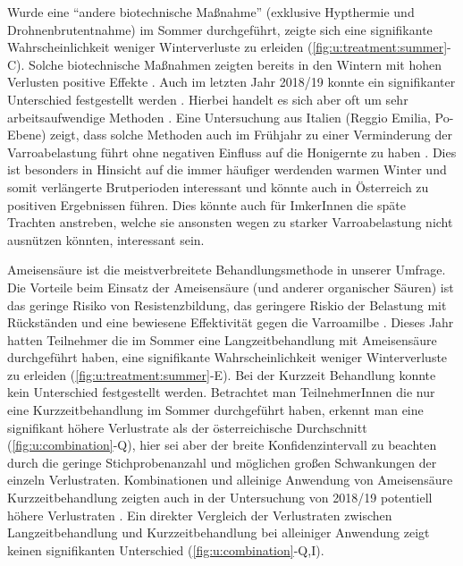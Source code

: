 \newline
Wurde eine \enquote{andere biotechnische Maßnahme} (exklusive Hypthermie und Drohnenbrutentnahme) im Sommer durchgeführt, zeigte sich eine signifikante Wahrscheinlichkeit weniger Winterverluste zu erleiden (\cref{fig:u:treatment:summer}-C). Solche biotechnische Maßnahmen zeigten bereits in den Wintern mit hohen Verlusten positive Effekte \citep{crailsheim2018}. Auch im letzten Jahr 2018/19 konnte ein signifikanter Unterschied festgestellt werden \citep{oberreiter2020}. Hierbei handelt es sich aber oft um sehr arbeitsaufwendige Methoden \citep{rosenkranz2010}. Eine Untersuchung aus Italien (Reggio Emilia, Po-Ebene) zeigt, dass solche Methoden auch im Frühjahr zu einer Verminderung der Varroabelastung führt ohne negativen Einfluss auf die Honigernte zu haben \citep{lodesani2019}. Dies ist besonders in Hinsicht auf die immer häufiger werdenden warmen Winter und somit verlängerte Brutperioden interessant und könnte auch in Österreich zu positiven Ergebnissen führen. Dies könnte auch für ImkerInnen die späte Trachten anstreben, welche sie ansonsten wegen zu starker Varroabelastung nicht ausnützen könnten, interessant sein.


Ameisensäure ist die meistverbreitete Behandlungsmethode in unserer Umfrage. Die Vorteile beim Einsatz der Ameisensäure (und anderer organischer Säuren) ist das geringe Risiko von Resistenzbildung, das geringere Riskio der Belastung mit Rückständen und eine bewiesene Effektivität gegen die Varroamilbe \citep{rosenkranz2010, noel2020}.
\newline
Dieses Jahr hatten Teilnehmer die im Sommer eine Langzeitbehandlung mit Ameisensäure durchgeführt haben, eine signifikante Wahrscheinlichkeit weniger Winterverluste zu erleiden (\cref{fig:u:treatment:summer}-E). Bei der Kurzzeit Behandlung konnte kein Unterschied festgestellt werden. Betrachtet man TeilnehmerInnen die nur eine Kurzzeitbehandlung im Sommer durchgeführt haben, erkennt man eine signifikant höhere Verlustrate als der österreichische Durchschnitt (\cref{fig:u:combination}-Q), hier sei aber der breite Konfidenzintervall zu beachten durch die geringe Stichprobenanzahl und möglichen großen Schwankungen der einzeln Verlustraten. Kombinationen und alleinige Anwendung von Ameisensäure Kurzzeitbehandlung zeigten auch in der Untersuchung von 2018/19 potentiell höhere Verlustraten \citep{oberreiter2020}. Ein direkter Vergleich der Verlustraten zwischen Langzeitbehandlung und Kurzzeitbehandlung bei alleiniger Anwendung zeigt keinen signifikanten Unterschied (\cref{fig:u:combination}-Q,I).

